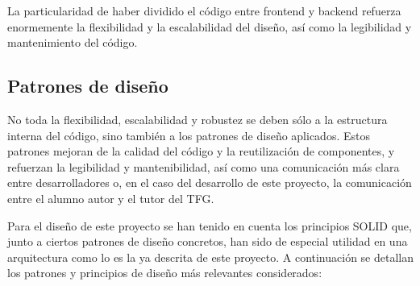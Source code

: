La particularidad de haber dividido el código entre frontend y backend refuerza enormemente la flexibilidad y la escalabilidad del diseño, así como la legibilidad y mantenimiento del código.

\subsection{Patrones de diseño}

No toda la flexibilidad, escalabilidad y robustez se deben sólo a la estructura interna del código, sino también a los patrones de diseño \cite{gamma1994design} aplicados. Estos patrones mejoran de la calidad del código y la reutilización de componentes, y refuerzan la legibilidad y mantenibilidad, así como una comunicación más clara entre desarrolladores o, en el caso del desarrollo de este proyecto, la comunicación entre el alumno autor y el tutor del TFG. 

Para el diseño de este proyecto se han tenido en cuenta los principios SOLID \cite{solid_principles} que, junto a ciertos patrones de diseño concretos, han sido de especial utilidad en una arquitectura como lo es la ya descrita de este proyecto. A continuación se detallan los patrones y principios de diseño más relevantes considerados:

